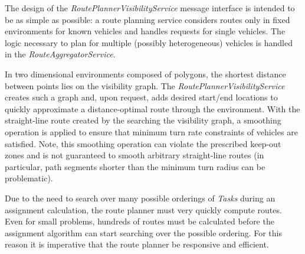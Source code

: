 The design of the \emph{RoutePlannerVisibilityService} message interface
is intended to be as simple as possible: a route planning service
considers routes only in fixed environments for known vehicles and
handles requests for single vehicles. The logic necessary to plan for
multiple (possibly heterogeneous) vehicles is handled in the
\emph{RouteAggregatorService}.

In two dimensional environments composed of polygons, the shortest
distance between points lies on the visibility graph. The
\emph{RoutePlannerVisibilityService} creates such a graph and, upon
request, adds desired start/end locations to quickly approximate a
distance-optimal route through the environment. With the straight-line
route created by the searching the visibility graph, a smoothing
operation is applied to ensure that minimum turn rate constraints of
vehicles are satisfied. Note, this smoothing operation can violate the
prescribed keep-out zones and is not guaranteed to smooth arbitrary
straight-line routes (in particular, path segments shorter than the
minimum turn radius can be problematic).

Due to the need to search over many possible orderings of \emph{Tasks}
during an assignment calculation, the route planner must very quickly
compute routes. Even for small problems, hundreds of routes must be
calculated before the assignment algorithm can start searching over the
possible ordering. For this reason it is imperative that the route
planner be responsive and efficient.

